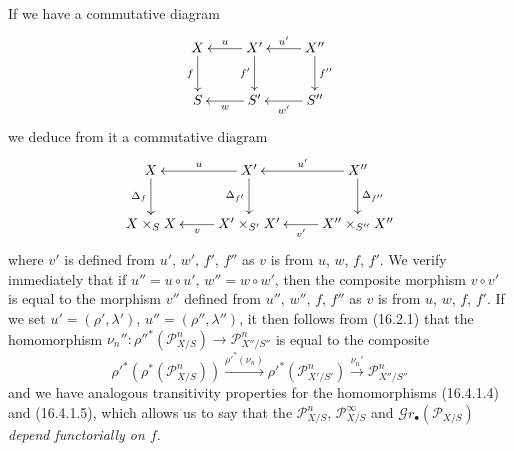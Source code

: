 \begin{env}[16.4.2]
\label{IV.16.4.2}
If we have a commutative diagram
\[
  \xymatrix{
    X \ar[d]_-{f} & X' \ar[l]_-u \ar[d]_-{f'} &
      X'' \ar[l]_-{u'} \ar[d]^-{f''} \\
    S & S' \ar[l]^-w & S'' \ar[l]^-{w'}
  }
\]
we deduce from it a commutative diagram
\[
  \xymatrix{
    X \ar[d]_-{\Delta_f} & X' \ar[l]_-u \ar[d]_-{\Delta_{f'}} &
      X'' \ar[l]_-{u'} \ar[d]^-{\Delta_{f''}} \\
    X\times_S X & X'\times_{S'}X' \ar[l]^-v &
      X''\times_{S''}X'' \ar[l]^-{v'}
  }
\]
where $v'$ is defined from $u'$, $w'$, $f'$, $f''$ as $v$ is from
$u$, $w$, $f$, $f'$. We verify immediately that if $u''=u\circ u'$,
$w''=w\circ w'$, then the composite morphism $v\circ v'$ is equal to the morphism
$v''$ defined from $u''$, $w''$, $f$, $f''$ as $v$ is from $u$,
$w$, $f$, $f'$. If we set $u'=(\rho',\lambda')$,
$u''=(\rho'',\lambda'')$, it then follows from (16.2.1) that the homomorphism
$\nu_n'':\rho''^*(\mathscr{P}_{X/S}^n)\to\mathscr{P}_{X''/S''}^n$ is equal to the
composite
\[
  \rho'^*(\rho^*(\mathscr{P}_{X/S}^n))
  \xrightarrow{\rho'^*(\nu_n)}
  \rho'^*(\mathscr{P}_{X'/S'}^n)
  \xrightarrow{\nu_n'}\mathscr{P}_{X''/S''}^n
\]
and we have analogous transitivity properties for the homomorphisms
(16.4.1.4) and (16.4.1.5), which allows us to say that the
$\mathscr{P}_{X/S}^n$, $\mathscr{P}_{X/S}^\infty$ and
$\mathscr{G}r_\bullet(\mathscr{P}_{X/S})$ \emph{depend functorially on $f$}.
\end{env}

